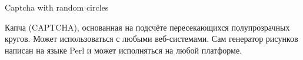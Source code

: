 Captcha with random circles

Капча (C\+A\+P\+T\+C\+HA), основанная на подсчёте пересекающихся полупрозрачных кругов. Может использоваться с любыми веб-\/системами. Сам генератор рисунков написан на языке Perl и может исполняться на любой платформе. 